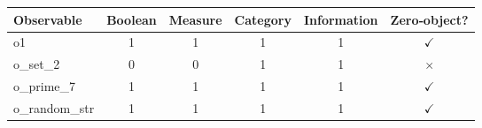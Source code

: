 \begin{tabular}{l c c c c c}
\toprule
\textbf{Observable} & \textbf{Boolean} & \textbf{Measure} & \textbf{Category} & \textbf{Information} & \textbf{Zero‑object?} \\
\midrule
  o1 & 1 & 1 & 1 & 1 & $\checkmark$ \\
  o\_set\_2 & 0 & 0 & 1 & 1 & $\times$ \\
  o\_prime\_7 & 1 & 1 & 1 & 1 & $\checkmark$ \\
  o\_random\_str & 1 & 1 & 1 & 1 & $\checkmark$ \\
\bottomrule
\end{tabular}